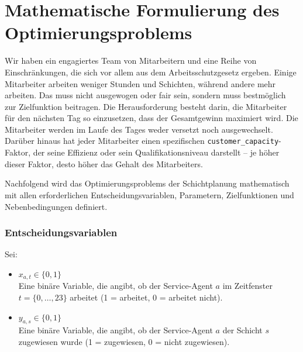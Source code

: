 
\chapter{Mathematische Formulierung des Optimierungsproblems}
Wir haben ein engagiertes Team von Mitarbeitern und eine Reihe von Einschränkungen, die sich vor allem aus dem Arbeitsschutzgesetz ergeben. Einige Mitarbeiter arbeiten weniger Stunden und Schichten, während andere mehr arbeiten. Das muss nicht ausgewogen oder fair sein, sondern muss bestmöglich zur Zielfunktion beitragen. Die Herausforderung besteht darin, die Mitarbeiter für den nächsten Tag so einzusetzen, dass der Gesamtgewinn maximiert wird. Die Mitarbeiter werden im Laufe des Tages weder versetzt noch ausgewechselt. Darüber hinaus hat jeder Mitarbeiter einen spezifischen \texttt{customer_capacity}-Faktor, der seine Effizienz oder sein Qualifikationsniveau darstellt -- je höher dieser Faktor, desto höher das Gehalt des Mitarbeiters.

Nachfolgend wird das Optimierungsproblems der Schichtplanung mathematisch mit allen erforderlichen Entscheidungsvariablen, Parametern, Zielfunktionen und Nebenbedingungen definiert.

\subsection*{Entscheidungsvariablen}
Sei:
\begin{itemize}
    \item $ x_{a,t} \in \{0, 1\} $\\
          Eine binäre Variable, die angibt, ob der Service-Agent $ a $ im Zeitfenster $ t = \{ 0, \dots, 23\} $ arbeitet (1 = arbeitet, 0 = arbeitet nicht).
    \item $ y_{a,s} \in \{0, 1\} $\\
          Eine binäre Variable, die angibt, ob der Service-Agent $ a $ der Schicht $ s $ zugewiesen wurde (1 = zugewiesen, 0 = nicht zugewiesen).
\end{itemize}

